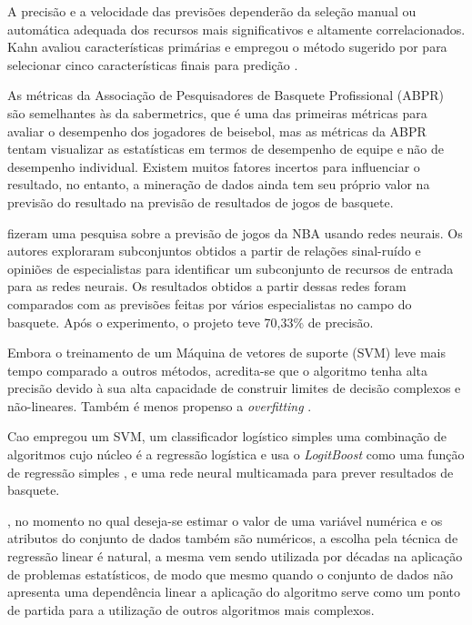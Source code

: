 A precisão e a velocidade das previsões dependerão da seleção manual ou automática adequada dos recursos mais significativos e altamente correlacionados. Kahn avaliou características primárias e empregou o método sugerido por \cite{Purucker1996} para selecionar cinco características finais para predição \cite{Kahn2003}.

As métricas da Associação de Pesquisadores de Basquete Profissional (ABPR) são semelhantes às da sabermetrics, que é uma das primeiras métricas para avaliar o desempenho dos jogadores de beisebol, mas as métricas da ABPR tentam visualizar as estatísticas em termos de desempenho de equipe e não de desempenho individual. Existem muitos fatores incertos para influenciar o resultado, no entanto, a mineração de dados ainda tem seu próprio valor na previsão do resultado na previsão de resultados de jogos de basquete.\cite{Schumaker2010}

 fizeram uma pesquisa sobre a previsão de jogos da NBA usando redes neurais. Os autores exploraram subconjuntos obtidos a partir de relações sinal-ruído e opiniões de especialistas para identificar um subconjunto de recursos de entrada para as redes neurais. Os resultados obtidos a partir dessas redes foram comparados com as previsões feitas por vários especialistas no campo do basquete. Após o experimento, o projeto teve 70,33\% de precisão.

Embora o treinamento de um Máquina de vetores de suporte (SVM) leve mais tempo comparado a outros métodos, acredita-se que o algoritmo tenha alta precisão devido à sua alta capacidade de construir limites de decisão complexos e não-lineares. Também é menos propenso a \textit{overfitting} \cite{Han2017}. 

Cao empregou um SVM, um classificador logístico simples uma combinação de algoritmos cujo núcleo é a regressão logística e usa o \textit{LogitBoost} como uma função de regressão simples \cite{Landwehr2005}, e uma rede neural multicamada para prever resultados de basquete.

, no momento no qual deseja-se estimar o valor de uma variável numérica e os atributos do  conjunto de dados também são numéricos, a escolha pela técnica de regressão linear é natural, a mesma vem sendo utilizada por décadas na aplicação de problemas estatísticos, de modo que mesmo quando o conjunto de dados não apresenta uma dependência linear a aplicação do algoritmo serve como um ponto de partida para a utilização de outros algoritmos mais complexos.


